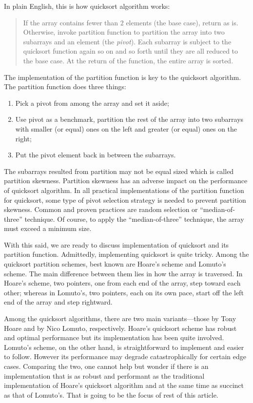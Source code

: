 In plain English, this is how quicksort algorithm works:
\begin{quote}
    If the array contains fewer than $2$ elements (the base case), return as is.
    Otherwise, invoke partition function to partition the array into two subarrays and an
    element (the \emph{pivot}).
    Each subarray is subject to the quicksort function again so on and so forth
    until they are all reduced to the base case.
    At the return of the function, the entire array is sorted.
\end{quote}
The implementation of the partition function is key to the quicksort algorithm.
The partition function does three things:
\begin{enumerate}
    \item Pick a pivot from among the array and set it aside;
    \item Use pivot as a benchmark, partition the rest of the array into two subarrays
    with smaller (or equal) ones on the left and greater (or equal) ones on the right;
    \item Put the pivot element back in between the subarrays.
\end{enumerate}

The subarrays resulted from partition may not be equal sized which is called partition skewness.
Partition skewness has an adverse impact on the performance of quicksort algorithm.
In all practical implementations of the partition function for quicksort, some type of pivot
selection strategy is needed to prevent partition skewness.
Common and proven practices are random selection or ``median-of-three''
technique\cite{sedgewick:1978,sedgewick1977}.
Of course, to apply the ``median-of-three'' technique, the array must exceed a minimum size.


With this said, we are ready to discuss implementation of quicksort and its partition function.
Admittedly, implementing quicksort is quite tricky.
Among the quicksort partition schemes, best known are
Hoare's scheme and Lomuto's scheme\cite{Hoare1961,Bentley:1986:PP}.
The main difference between them lies in how the array is traversed.
In Hoare's scheme, two pointers, one from each end of the array, step toward each other;
whereas in Lomuto's, two pointers, each on its own pace, start off the left end of the array
and step rightward.


Among the quicksort algorithms, there are two main variants---those
by Tony Hoare and by Nico Lomuto, respectively.
Hoare's quicksort scheme has robust and optimal performance but its
implementation has been quite involved.
Lomuto's scheme, on the other hand, is straightforward to implement and easier to follow.
However its performance may degrade catastrophically for certain edge cases.
Comparing the two,
one cannot help but wonder if there is an implementation
that is as robust and performant as the traditional implementation of Hoare's quicksort algorithm
and at the same time as succinct as that of Lomuto's.
That is going to be the focus of rest of this article.


